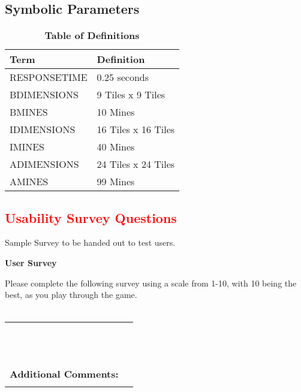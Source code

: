 \documentclass[12pt, titlepage]{article}
\begin{document}
\subsection{Symbolic Parameters}
\begin{table}[!htbp]
\caption{\textbf{Table of Definitions}} \label{Table}
\begin{tabularx}{\textwidth}{p{3.5cm}X}
\toprule
\textbf{Term} & \textbf{Definition}\\
\midrule
	RESPONSETIME & 0.25 seconds\\
	BDIMENSIONS & 9 Tiles x 9 Tiles\\
	BMINES & 10 Mines\\
	IDIMENSIONS & 16 Tiles x 16 Tiles\\
	IMINES & 40 Mines\\
	ADIMENSIONS & 24 Tiles x 24 Tiles\\
	AMINES & 99 Mines\\
\bottomrule
\end{tabularx}
\end{table}

\newpage
\subsection{\textcolor{red}{Usability Survey Questions}}
Sample Survey to be handed out to test users.
\begin{mdframed}[linewidth=1pt]
\begin{center}
{\bf \large User Survey}\\[\baselineskip]
\end{center}
\noindent Please complete the following survey using a scale from 1-10, with 
10 being the best, as you play through the game.\\
\\
\noindent \begin{tabularx}{\textwidth}{@{}p{5.0cm}X@{}}
\noindent {\bf Entertainment:}\\
\\\\
\noindent {\bf User Friendliness:}\\
\\\\
\noindent {\bf Game Difficulty:}\\
\\\\
\noindent {\bf Overall Appearance:}\\
\\\\
{\bf Additional Comments:} & \\\\[5\baselineskip]
\end{tabularx}
\end{mdframed}
\end{document}
